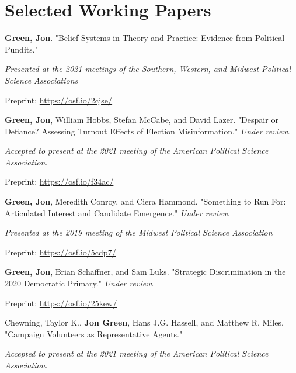 \documentclass[letterpaper]{article}
\renewenvironment{itemize}{
  \begin{list}{}{
    \setlength{\leftmargin}{1.5em}
  }
}{
  \end{list}
}
\begin{document}
\section*{Selected Working Papers}

\begin{itemize}

\item \textbf{Green, Jon}. "Belief Systems in Theory and Practice: Evidence from Political Pundits."
\begin{itemize}
\item \textit{Presented at the 2021 meetings of the Southern, Western, and Midwest Political Science Associations}
\item Preprint: \url{https://osf.io/2cjse/}
\end{itemize}

\item  \textbf{Green, Jon}, William Hobbs, Stefan McCabe, and David Lazer. "Despair or Defiance? Assessing Turnout Effects of Election Misinformation."  \textit{Under review}.
\begin{itemize}
\item \textit{Accepted to present at the 2021 meeting of the American Political Science Association}.
\item Preprint: \url{https://osf.io/f34ac/}
\end{itemize}

\item \textbf{Green, Jon}, Meredith Conroy, and Ciera Hammond. "Something to Run For: Articulated Interest and Candidate Emergence."  \textit{Under review}.
\begin{itemize}
\item \textit{Presented at the 2019 meeting of the Midwest Political Science Association}
\item Preprint: \url{https://osf.io/5cdp7/}
\end{itemize}

\item \textbf{Green, Jon}, Brian Schaffner, and Sam Luks. "Strategic Discrimination in the 2020 Democratic Primary."  \textit{Under review}.
\begin{itemize}
\item Preprint: \url{https://osf.io/25kew/}
\end{itemize}

\item Chewning, Taylor K., \textbf{Jon Green}, Hans J.G. Hassell, and Matthew R. Miles. "Campaign Volunteers as Representative Agents."
\begin{itemize}
\item \textit{Accepted to present at the 2021 meeting of the American Political Science Association}.
\end{itemize}


\end{itemize}
\end{document}
